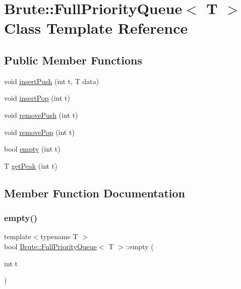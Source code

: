 \hypertarget{classBrute_1_1FullPriorityQueue}{}\section{Brute\+:\+:Full\+Priority\+Queue$<$ T $>$ Class Template Reference}
\label{classBrute_1_1FullPriorityQueue}
\subsection*{Public Member Functions}
\begin{DoxyCompactItemize}
\item 
void \hyperlink{classBrute_1_1FullPriorityQueue_ac4a7840f16b0fff5ca90920f3646a504}{insert\+Push} (int t, T data)
\item 
void \hyperlink{classBrute_1_1FullPriorityQueue_a0dbc488046321d9ef58c7b124d9f71a7}{insert\+Pop} (int t)
\item 
void \hyperlink{classBrute_1_1FullPriorityQueue_a3faa79fc9fad31f2572d80df3beea392}{remove\+Push} (int t)
\item 
void \hyperlink{classBrute_1_1FullPriorityQueue_a4310a7e462f8ef3a6e2078e695a384b2}{remove\+Pop} (int t)
\item 
bool \hyperlink{classBrute_1_1FullPriorityQueue_a572c0b02ac94766f83b79ca41ef00d81}{empty} (int t)
\item 
T \hyperlink{classBrute_1_1FullPriorityQueue_a696b62029dba8ba7571a124c64ba94ef}{get\+Peak} (int t)
\end{DoxyCompactItemize}


\subsection{Member Function Documentation}
\mbox{\label{classBrute_1_1FullPriorityQueue_a572c0b02ac94766f83b79ca41ef00d81}} 
\subsubsection{\texorpdfstring{empty()}{empty()}}
{\footnotesize\ttfamily template$<$typename T $>$ \\
bool \hyperlink{classBrute_1_1FullPriorityQueue}{Brute\+::\+Full\+Priority\+Queue}$<$ T $>$\+::empty (\begin{DoxyParamCaption}\item[{int}]{t }\end{DoxyParamCaption})}

